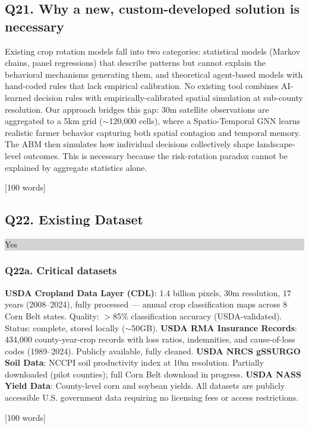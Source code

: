 \documentclass[11pt,letterpaper]{article}
\newcommand{\answer}[1]{%
    \vspace{0.2em}%
    \noindent\colorbox{answerbox}{\parbox{\dimexpr\textwidth-2\fboxsep}{%
        \vspace{0.4em}#1\vspace{0.4em}%
    }}%
    \vspace{0.5em}%
}
\newcommand{\selection}[1]{%
    \vspace{0.2em}%
    \noindent\colorbox{lightgray}{\parbox{\dimexpr\textwidth-2\fboxsep}{%
        \vspace{0.3em}#1\vspace{0.3em}%
    }}%
    \vspace{0.5em}%
}
\newcommand{\wordcount}[1]{%
    \hfill{\scriptsize\textcolor{notegray}{[#1 words]}}%
}
\begin{document}
\subsection{Q21. Why a new, custom-developed solution is necessary}
\answer{Existing crop rotation models fall into two categories: statistical models (Markov chains, panel regressions) that describe patterns but cannot explain the behavioral mechanisms generating them, and theoretical agent-based models with hand-coded rules that lack empirical calibration. No existing tool combines AI-learned decision rules with empirically-calibrated spatial simulation at sub-county resolution. Our approach bridges this gap: 30m satellite observations are aggregated to a 5km grid (${\sim}$120,000 cells), where a Spatio-Temporal GNN learns realistic farmer behavior capturing both spatial contagion and temporal memory. The ABM then simulates how individual decisions collectively shape landscape-level outcomes. This is necessary because the risk-rotation paradox cannot be explained by aggregate statistics alone.}
\wordcount{100}

\subsection{Q22. Existing Dataset}
\selection{Yes}

\subsubsection{Q22a. Critical datasets}
\answer{\textbf{USDA Cropland Data Layer (CDL)}: 1.4 billion pixels, 30m resolution, 17 years (2008--2024), fully processed --- annual crop classification maps across 8 Corn Belt states. Quality: {$>$}85\% classification accuracy (USDA-validated). Status: complete, stored locally (${\sim}$50GB). \textbf{USDA RMA Insurance Records}: 434,000 county-year-crop records with loss ratios, indemnities, and cause-of-loss codes (1989--2024). Publicly available, fully cleaned. \textbf{USDA NRCS gSSURGO Soil Data}: NCCPI soil productivity index at 10m resolution. Partially downloaded (pilot counties); full Corn Belt download in progress. \textbf{USDA NASS Yield Data}: County-level corn and soybean yields. All datasets are publicly accessible U.S. government data requiring no licensing fees or access restrictions.}
\wordcount{100}

\end{document}
